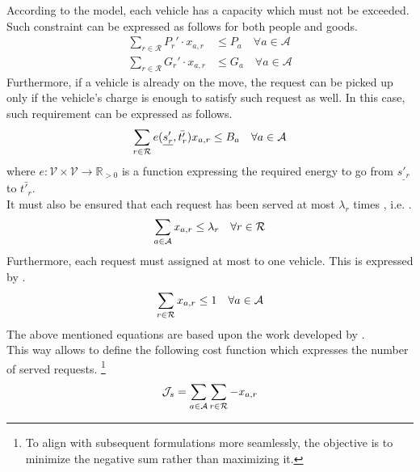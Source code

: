 According to the model, each vehicle has a capacity which must not be exceeded. Such constraint can be expressed as follows for both people and goods. 
\begin{align}
	\sum_{r \in \mathcal{R}} P_r' \cdot x_{a,r} &\leq P_a \quad \forall a \in \mathcal{A}\label{eq:cons_quantity_p}\\
	\sum_{r \in \mathcal{R}} G_r' \cdot x_{a,r} &\leq G_a \quad \forall a \in \mathcal{A}\label{eq:cons_quantity_g}
\end{align}
Furthermore, if a vehicle is already on the move, the request can be picked up only if the vehicle's charge is enough to satisfy such request as well. In this case, such requirement can be expressed as follows. 
\begin{equation}
	\sum_{r \in \mathcal{R}} e(\underline{s'_r}, \bar{t'_r}) x_{a,r}\leq B_a \quad \forall a \in \mathcal{A}\\
	\label{eq:cons_charg}
\end{equation}
where $e: \mathcal{V} \times \mathcal{V} \rightarrow \mathbb{R}_{>0}$ is a function expressing the required energy to go from $\underline{s'_r}$ to $\bar{t'_r}$.\\
It must also be ensured that each request has been served at most $\lambda_r$ times , i.e. . 
\begin{equation}
	\sum_{a \in \mathcal{A}} x_{a,r} \leq \lambda_r \quad \forall r \in \mathcal{R}\\
	\label{eq:req_served}
\end{equation}
Furthermore, each request must assigned at most to one vehicle. This is expressed by . 
\begin{equation}
	\sum_{r \in \mathcal{R}} x_{a,r} \leq 1\quad \forall a \in \mathcal{A}\\
	\label{eq:req_served_per_vehicle}
\end{equation}
The above mentioned equations are based upon the work developed by . \\
This way allows to define the following cost function which expresses the number of served requests. \footnote{To align with subsequent formulations more seamlessly, the objective is to minimize the negative sum rather than maximizing it.}
\begin{equation}
	\mathcal{J}_s = \sum_{a \in \mathcal{A}}\sum_{r \in \mathcal{R}} -x_{a,r}\\
	\label{eq:req_served_cfunction}
\end{equation}

